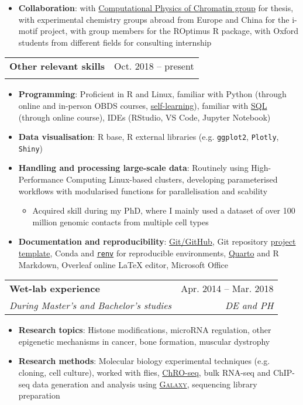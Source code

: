 \documentclass[a4paper,11pt]{article}
\makeatletter
\newcommand{\resumeItem}[2]{
  \item\small{
    \textbf{#1}{: #2 \vspace{-2pt}}
  }
}
\newcommand{\resumeSubheading}[4]{
  \vspace{-1pt}\item
    \begin{tabular*}{0.97\textwidth}[t]{l@{\extracolsep{\fill}}r}
      \textbf{#1} & #2 \\
      \textit{\small#3} & \textit{\small #4} \\
    \end{tabular*}\vspace{-5pt}
}
\newcommand{\resumeItemListStart}{\begin{itemize}}
\newcommand{\resumeItemListEnd}{\end{itemize}\vspace{-5pt}}
\makeatother
\begin{document}
            \resumeItemListStart
                \resumeItem{Collaboration}{with \href{http://www.collepardolab.org/}{Computational Physics of Chromatin group} for thesis, with experimental chemistry groups abroad from Europe and China for the i-motif project, with group members for the ROptimus R package, with Oxford students from different fields for consulting internship}
            \resumeItemListEnd

        \resumeSubheading
        {Other relevant skills}{Oct. 2018 -- present}{}{}
            \resumeItemListStart
                \resumeItem{Programming}{Proficient in R and Linux, familiar with Python (through online and in-person OBDS courses, \href{https://github.com/liezeltamon/advent-of-code}{self-learning}), familiar with \href{https://learn.365datascience.com/certificates/CC-1C72E62035/}{SQL} (through online course), IDEs (RStudio, VS Code, Jupyter Notebook)}
            \resumeItemListEnd

            \resumeItemListStart
                \resumeItem{Data visualisation}{R base, R external libraries (e.g. \texttt{ggplot2}, \texttt{Plotly}, \texttt{Shiny})}
            \resumeItemListEnd
            
            \resumeItemListStart
                \resumeItem{Handling and processing large-scale data}{Routinely using High-Performance Computing Linux-based clusters, developing parameterised workflows with modularised functions for parallelisation and scability}
                    \begin{itemize}
                        \item {Acquired skill during my PhD, where I mainly used a dataset of over 100 million genomic contacts from multiple cell types}
                    \end{itemize}
                \resumeItem{Documentation and reproducibility}{{\href{https://github.com/liezeltamon}{Git/GitHub}}, Git repository \href{https://github.com/liezeltamon/project-template}{project template}, Conda and \href{https://rstudio.github.io/renv/articles/renv.html}{\texttt{renv}} for reproducible environments, \href{https://quarto.org}{Quarto} and R Markdown, Overleaf online LaTeX editor, Microsoft Office}
                
            \resumeItemListEnd

        \resumeSubheading
        {Wet-lab experience}{Apr. 2014 -- Mar. 2018}{During Master's and Bachelor's studies}{DE and PH}
            \resumeItemListStart
                \resumeItem{Research topics}{Histone modifications, microRNA regulation, other epigenetic mechanisms in cancer, bone formation, muscular dystrophy}
                \resumeItem{Research methods}{Molecular biology experimental techniques (e.g. cloning, cell culture), worked with flies, \href{https://www.nature.com/articles/s41588-018-0244-3#data-availability}{ChRO-seq}, bulk RNA-seq and ChIP-seq data generation and analysis using \href{https://usegalaxy.org/}{\textsc{Galaxy}}, sequencing library preparation}
            \resumeItemListEnd
        
\end{document}
